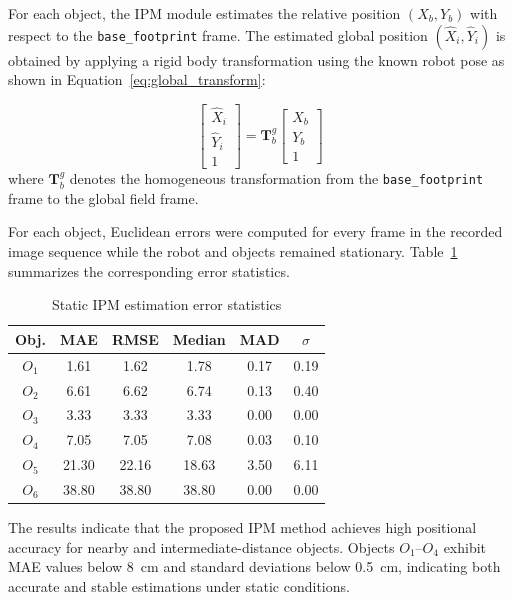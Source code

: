 \documentclass[journal]{IAENGtran}
\begin{document}
For each object, the IPM module estimates the relative position
$(X_b, Y_b)$ with respect to the \texttt{base\_footprint} frame.
The estimated global position $(\hat{X}_i, \hat{Y}_i)$ is obtained
by applying a rigid body transformation using the known robot pose as
shown in Equation~\ref{eq:global_transform}:

\begin{equation} \label{eq:global_transform}
\begin{bmatrix}
\hat{X}_i \\
\hat{Y}_i \\
1
\end{bmatrix}
=
\mathbf{T}_{b}^{g}
\begin{bmatrix}
X_b \\
Y_b \\
1
\end{bmatrix}
\end{equation}
where $\mathbf{T}_{b}^{g}$ denotes the homogeneous transformation
from the \texttt{base\_footprint} frame to the global field frame.

For each object, Euclidean errors were computed for every frame in the
recorded image sequence while the robot and objects remained stationary.
Table~\ref{tab:static_results} summarizes the corresponding error statistics.

\begin{table}[h]
\centering
\footnotesize
\caption{Static IPM estimation error statistics}
\label{tab:static_results}
\begin{tabular}{c c c c c c}
\toprule
\textbf{Obj.} &
\textbf{MAE} &
\textbf{RMSE} &
\textbf{Median} &
\textbf{MAD} &
\textbf{$\sigma$} \\
\midrule
$O_1$ & 1.61 & 1.62 & 1.78 & 0.17 & 0.19 \\
$O_2$ & 6.61 & 6.62 & 6.74 & 0.13 & 0.40 \\
$O_3$ & 3.33 & 3.33 & 3.33 & 0.00 & 0.00 \\
$O_4$ & 7.05 & 7.05 & 7.08 & 0.03 & 0.10 \\
$O_5$ & 21.30 & 22.16 & 18.63 & 3.50 & 6.11 \\
$O_6$ & 38.80 & 38.80 & 38.80 & 0.00 & 0.00 \\
\bottomrule
\end{tabular}
\end{table}

The results indicate that the proposed IPM method achieves high positional
accuracy for nearby and intermediate-distance objects. Objects $O_1$--$O_4$
exhibit MAE values below 8~cm and standard deviations below 0.5~cm, indicating
both accurate and stable estimations under static conditions.
\end{document}
